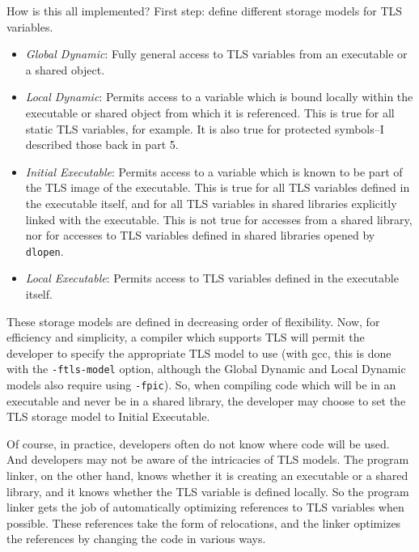 How is this all implemented? First step: define different storage models for
TLS variables.

\begin{itemize}
    \item \emph{Global Dynamic}: Fully general access to TLS variables from an
          executable or a shared object.

    \item \emph{Local Dynamic}: Permits access to a variable which is bound
          locally within the executable or shared object from which it is
          referenced. This is true for all static TLS variables, for example.
          It is also true for protected symbols--I described those back in part
          5.

    \item \emph{Initial Executable}: Permits access to a variable which is
          known to be part of the TLS image of the executable. This is true
          for all TLS variables defined in the executable itself, and for
          all TLS variables in shared libraries explicitly linked with the
          executable. This is not true for accesses from a shared library, nor
          for accesses to TLS variables defined in shared libraries opened by
          \texttt{dlopen}.

    \item \emph{Local Executable}: Permits access to TLS variables defined in
          the executable itself.
\end{itemize}

These storage models are defined in decreasing order of flexibility. Now,
for efficiency and simplicity, a compiler which supports TLS will permit the
developer to specify the appropriate TLS model to use (with gcc, this is done
with the \texttt{-ftls-model} option, although the Global Dynamic and Local
Dynamic models also require using \texttt{-fpic}). So, when compiling code
which will be in an executable and never be in a shared library, the developer
may choose to set the TLS storage model to Initial Executable.

Of course, in practice, developers often do not know where code will be used.
And developers may not be aware of the intricacies of TLS models. The program
linker, on the other hand, knows whether it is creating an executable or a
shared library, and it knows whether the TLS variable is defined locally. So
the program linker gets the job of automatically optimizing references to TLS
variables when possible. These references take the form of relocations, and the
linker optimizes the references by changing the code in various ways.


